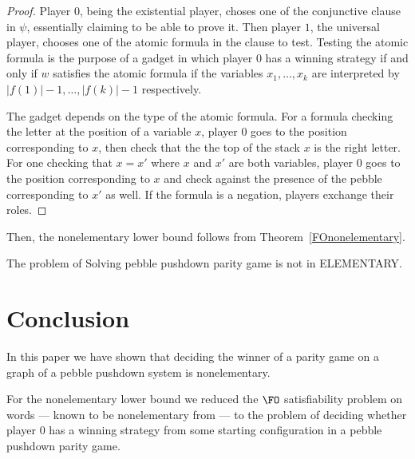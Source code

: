 \documentclass[a4paper,UKenglish,cleveref, autoref, thm-restate]{lipics-v2021}
\renewcommand{\C}{\mathcal{C}}
\begin{document}
\begin{proof}
Player $0$, being the existential player, choses one of the conjunctive clause in $\psi$, essentially claiming to be able to prove it. Then player $1$, the universal player, chooses one of the atomic formula in the clause to test. 
Testing the atomic formula is the purpose of a gadget 
in which
 player $0$ has a winning strategy 
  if and only if 
$w$ satisfies %
the atomic formula
 if the variables $x_1, \ldots, x_k$ are interpreted by 
$ |f(1)|-1, \ldots, |f(k)|-1$ respectively.



The gadget depends on the type of the atomic formula. For a formula checking the letter at the position of a variable $x$, player $0$ goes to the position corresponding to $x$, then check that the the top of the stack
$x$ is the right letter. For one checking that $x = x'$ where $x$ and $x'$ are both variables,
player $0$ goes to the position corresponding to $x$ and check against the presence of the pebble corresponding to $x'$ as well. If the formula is a negation, players exchange their roles.
\end{proof}

Then, the nonelementary lower bound follows from Theorem~\ref{FOnonelementary}. 



\begin{theorem}

The problem of {\sc Solving pebble pushdown parity game} is not in {\sc ELEMENTARY}.

\end{theorem}





\section{Conclusion}

In this paper we have shown that
deciding
the winner of a parity game on a graph of a pebble pushdown system 
is nonelementary.

	For the nonelementary lower bound
we reduced the $\FO$ satisfiability problem on words \---- known to be nonelementary
from \cite{Sto74} \---- to the
problem of deciding whether player $0$ has a winning strategy from some starting configuration in 
a pebble pushdown parity game.
\end{document}
